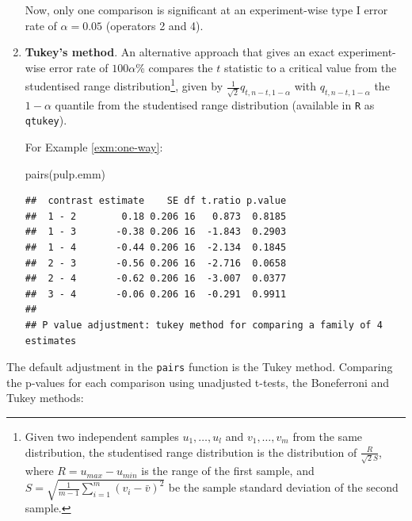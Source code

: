 \documentclass[
]{book}
\newenvironment{Shaded}{\begin{snugshade}}{\end{snugshade}}
\newcommand{\FunctionTok}[1]{\textcolor[rgb]{0.00,0.00,0.00}{#1}}
\newcommand{\NormalTok}[1]{#1}
\theoremstyle{definition}
\theoremstyle{definition}
\theoremstyle{definition}
\theoremstyle{definition}
\theoremstyle{remark}
\begin{document}
\begin{enumerate}
  Now, only one comparison is significant at an experiment-wise type I error rate of \(\alpha = 0.05\) (operators 2 and 4).
\item
  \textbf{Tukey's method}. An alternative approach that gives an exact experiment-wise error rate of \(100\alpha\)\% compares the \(t\) statistic to a critical value from the studentised range distribution\footnote{Given two independent samples \(u_1, \ldots, u_l\) and \(v_1,\ldots,v_m\) from the same distribution, the studentised range distribution is the distribution of \(\frac{R}{\sqrt{2}S}\), where \(R = u_{max}-u_{min}\) is the range of the first sample, and \(S = \sqrt{\frac{1}{m-1}\sum_{i=1}^m(v_i - \bar{v})^2}\) be the sample standard deviation of the second sample.}, given by \(\frac{1}{\sqrt{2}}q_{t, n-t, 1-\alpha}\) with \(q_{t, n-t, 1-\alpha}\) the \(1-\alpha\) quantile from the studentised range distribution (available in \texttt{R} as \texttt{qtukey}).

  For Example \ref{exm:one-way}:

\begin{Shaded}
\begin{Highlighting}[]
\FunctionTok{pairs}\NormalTok{(pulp.emm)}
\end{Highlighting}
\end{Shaded}

\begin{verbatim}
##  contrast estimate    SE df t.ratio p.value
##  1 - 2        0.18 0.206 16   0.873  0.8185
##  1 - 3       -0.38 0.206 16  -1.843  0.2903
##  1 - 4       -0.44 0.206 16  -2.134  0.1845
##  2 - 3       -0.56 0.206 16  -2.716  0.0658
##  2 - 4       -0.62 0.206 16  -3.007  0.0377
##  3 - 4       -0.06 0.206 16  -0.291  0.9911
## 
## P value adjustment: tukey method for comparing a family of 4 estimates
\end{verbatim}
\end{enumerate}

The default adjustment in the \texttt{pairs} function is the Tukey method. Comparing the p-values for each comparison using unadjusted t-tests, the Boneferroni and Tukey methods:
\end{document}
